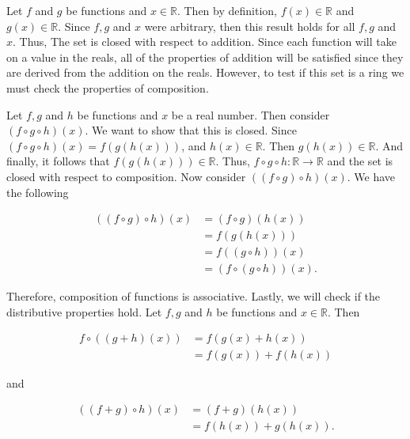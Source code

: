\documentclass[12pt, a4paper]{article}
\begin{document}
\begin{addmargin}[2.8em]{2.8em}

    Let $f$ and $g$ be functions and $x\in\mathbb{R}$. Then by definition, $f(x)\in\mathbb{R}$ and $g(x)\in\mathbb{R}$. Since $f,g$ and $x$ were arbitrary, then this result holds for all $f,g$ and $x$. Thus, The set is closed with respect to addition. Since each function will take on a value in the reals, all of the properties of addition will be satisfied since they are derived from the addition on the reals. However, to test if this set is a ring we must check the properties of composition.\par
    Let $f,g$ and $h$ be functions and $x$ be a real number. Then consider $(f\circ g\circ h)(x)$. We want to show that this is closed. Since $(f\circ g\circ h)(x)=f(g(h(x)))$, and $h(x)\in\mathbb{R}$. Then $g(h(x))\in\mathbb{R}$. And finally, it follows that $f(g(h(x)))\in\mathbb{R}$. Thus, $f\circ g\circ h\colon\mathbb{R}\rightarrow\mathbb{R}$ and the set is closed with respect to composition. Now consider $((f\circ g)\circ h)(x)$. We have the following\par
    
    \begin{equation*}
        \begin{split}
            ((f\circ g)\circ h)(x) & = (f\circ g)(h(x)) \\
            & =f(g(h(x))) \\
            & =f((g\circ h))(x) \\
            & =(f\circ (g\circ h))(x).
        \end{split}
    \end{equation*}
    
    \noindent Therefore, composition of functions is associative. Lastly, we will check if the distributive properties hold. Let $f,g$ and $h$ be functions and $x\in\mathbb{R}$. Then
    
    \begin{equation*}
        \begin{split}
            f\circ((g+h)(x)) & = f(g(x)+h(x)) \\
            & = f(g(x))+f(h(x))
        \end{split}
    \end{equation*}
    
    \noindent and
    
    \begin{equation*}
        \begin{split}
            ((f+g)\circ h)(x) & = (f+g)(h(x)) \\
            & = f(h(x))+g(h(x)).
        \end{split}
    \end{equation*}
    

\end{addmargin}
\end{document}
